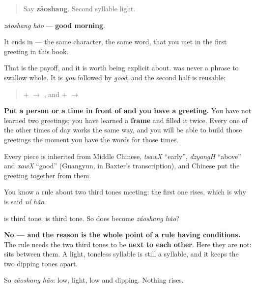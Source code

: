 \label{lesson:ZH-C07-zaoshanghao}



\begin{quote}
Say \textbf{zǎoshang}. Second syllable light.
\end{quote}

\begin{cousinweb}
\begin{quote}
\end{quote}

\textbf{} \emph{zǎoshang hǎo} — \textbf{good morning}.

It ends in \textbf{} — the same character, the same word, that you met in the first greeting in this book.

That is the payoff, and it is worth being explicit about. \textbf{} was never a phrase to swallow whole. It is  \emph{you} followed by  \emph{good}, and the second half is reusable:

\begin{quote}
 +  $\to$ \textbf{}, and  +  $\to$ \textbf{}
\end{quote}

\textbf{Put a person or a time in front of  and you have a greeting.} You have not learned two greetings; you have learned a \textbf{frame} and filled it twice. Every one of the other times of day works the same way, and you will be able to build those greetings the moment you have the words for those times.

Every piece is inherited from Middle Chinese, \emph{tsawX} \textquotedblleft{}early\textquotedblright{}, \emph{dzyangH} \textquotedblleft{}above\textquotedblright{} and \emph{xawX} \textquotedblleft{}good\textquotedblright{} (Guangyun, in Baxter's transcription), and Chinese put the greeting together from them.
\end{cousinweb}

\begin{sounds}
You know a rule about two third tones meeting: the first one rises, which is why  is said \emph{ní hǎo}.

\textbf{} is third tone. \textbf{} is third tone. So does  become \emph{záoshang hǎo}?

\textbf{No — and the reason is the whole point of a rule having conditions.} The rule needs the two third tones to be \textbf{next to each other}. Here they are not:  sits between them. A light, toneless syllable is still a syllable, and it keeps the two dipping tones apart.

So \emph{zǎoshang hǎo}:  low,  light,  low and dipping. Nothing rises.
\end{sounds}

